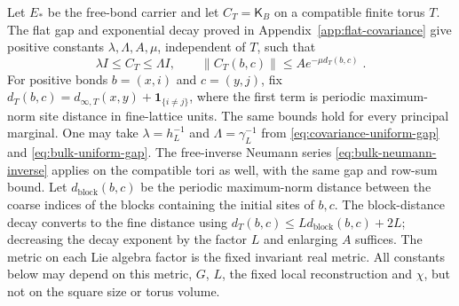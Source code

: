 \documentclass[11pt]{article}
\begin{document}
Let $E_*$ be the free-bond carrier and let $C_T=\mathsf K_B$ on a compatible finite torus $T$. The flat gap and exponential decay proved in Appendix~\ref{app:flat-covariance} give positive constants $\lambda,\Lambda,A,\mu$, independent of $T$, such that
\begin{equation}\label{eq:marginal-covariance-input}
    \lambda I\leq C_T\leq \Lambda I,
    \qquad \|C_T(b,c)\|\leq A e^{-\mu d_T(b,c)}\;.
\end{equation}
For positive bonds $b=(x,i)$ and $c=(y,j)$, fix $d_T(b,c)=d_{\infty,T}(x,y)+\mathbf1_{\{i\ne j\}}$, where the first term is periodic maximum-norm site distance in fine-lattice units. The same bounds hold for every principal marginal. One may take $\lambda=h_L^{-1}$ and $\Lambda=\gamma_L^{-1}$ from \eqref{eq:covariance-uniform-gap} and \eqref{eq:bulk-uniform-gap}. The free-inverse Neumann series \eqref{eq:bulk-neumann-inverse} applies on the compatible tori as well, with the same gap and row-sum bound. Let $d_{\mathrm{block}}(b,c)$ be the periodic maximum-norm distance between the coarse indices of the blocks containing the initial sites of $b,c$. The block-distance decay converts to the fine distance using $d_T(b,c)\leq Ld_{\mathrm{block}}(b,c)+2L$; decreasing the decay exponent by the factor $L$ and enlarging $A$ suffices. The metric on each Lie algebra factor is the fixed invariant real metric. All constants below may depend on this metric, $G$, $L$, the fixed local reconstruction and $\chi$, but not on the square size or torus volume.
\end{document}
